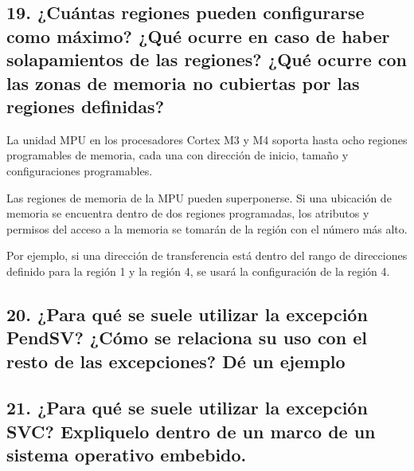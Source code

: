 \documentclass[10pt,a4paper,twoside,spanish]{article}	%
\begin{document}
\subsection*{19. ¿Cuántas regiones pueden configurarse como máximo? ¿Qué ocurre en caso de haber solapamientos de las regiones? ¿Qué ocurre con las zonas de memoria no cubiertas por las regiones definidas?}

La unidad MPU en los procesadores Cortex M3 y M4 soporta hasta ocho regiones programables de memoria, cada una con dirección de inicio, tamaño y configuraciones programables.

Las regiones de memoria de la MPU pueden superponerse. Si una ubicación de memoria se encuentra dentro de dos regiones programadas, los atributos y permisos del acceso a la memoria se tomarán de la región con el número más alto.

Por ejemplo, si una dirección de transferencia está dentro del rango de direcciones definido para la región 1 y la región 4, se usará la configuración de la región 4.


\subsection*{20. ¿Para qué se suele utilizar la excepción PendSV? ¿Cómo se relaciona su uso con el resto de las excepciones? Dé un ejemplo}

\subsection*{21. ¿Para qué se suele utilizar la excepción SVC? Expliquelo dentro de un marco de un sistema operativo embebido.}
\end{document}
